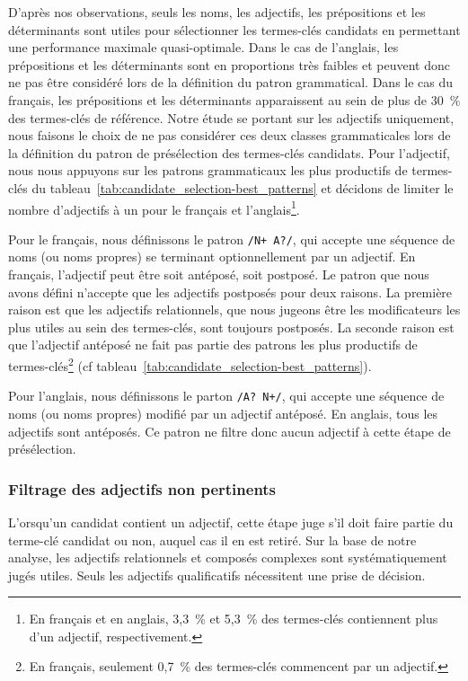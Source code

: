         D'après nos observations, seuls les noms, les adjectifs, les
        prépositions et les déterminants sont utiles pour sélectionner les
        termes-clés candidats en permettant une performance maximale
        quasi-optimale. Dans le cas de l'anglais, les prépositions et les
        déterminants sont en proportions très faibles et peuvent donc ne pas
        être considéré lors de la définition du patron grammatical. Dans le cas
        du français, les prépositions et les déterminants apparaissent au sein
        de plus de 30~\% des termes-clés de référence. Notre étude se portant
        sur les adjectifs uniquement, nous faisons le choix de ne pas considérer
        ces deux classes grammaticales lors de la définition du patron de
        présélection des termes-clés candidats. Pour l'adjectif, nous nous
        appuyons sur les patrons grammaticaux les plus productifs de termes-clés
        du tableau~\ref{tab:candidate_selection-best_patterns} et décidons de
        limiter le nombre d'adjectifs à un pour le français et
        l'anglais\footnote{En français et en anglais, 3,3~\% et 5,3~\% des
        termes-clés contiennent plus d'un adjectif, respectivement.}.
        
        Pour le français, nous définissons le patron \texttt{/N+ A?/}, qui
        accepte une séquence de noms (ou noms propres) se terminant
        optionnellement par un adjectif. En français, l'adjectif peut être soit
        antéposé, soit postposé. Le patron que nous avons défini n'accepte que
        les adjectifs postposés pour deux raisons. La première raison est que
        les adjectifs relationnels, que nous jugeons être les modificateurs les
        plus utiles au sein des termes-clés, sont toujours postposés. La seconde
        raison est que l'adjectif antéposé ne fait pas partie des patrons les
        plus productifs de termes-clés\footnote{En français, seulement 0,7~\%
        des termes-clés commencent par un adjectif.} (cf
        tableau~\ref{tab:candidate_selection-best_patterns}).
        
        Pour l'anglais, nous définissons le parton \texttt{/A? N+/}, qui
        accepte une séquence de noms (ou noms propres) modifié par un adjectif
        antéposé. En anglais, tous les adjectifs sont antéposés. Ce patron ne
        filtre donc aucun adjectif à cette étape de présélection.

      \subsubsection{Filtrage des adjectifs non pertinents}
      \label{subsubsec:main:domain_independent_keyphrase_extraction-keyphrase_candidate_selection-modifiers_filtering-adjective_filtering}
        L'orsqu'un candidat contient un adjectif, cette étape juge s'il doit
        faire partie du terme-clé candidat ou non, auquel cas il  en est retiré.
        Sur la base de notre analyse, les adjectifs relationnels et composés
        complexes sont systématiquement jugés utiles. Seuls les adjectifs
        qualificatifs nécessitent une prise de décision.

